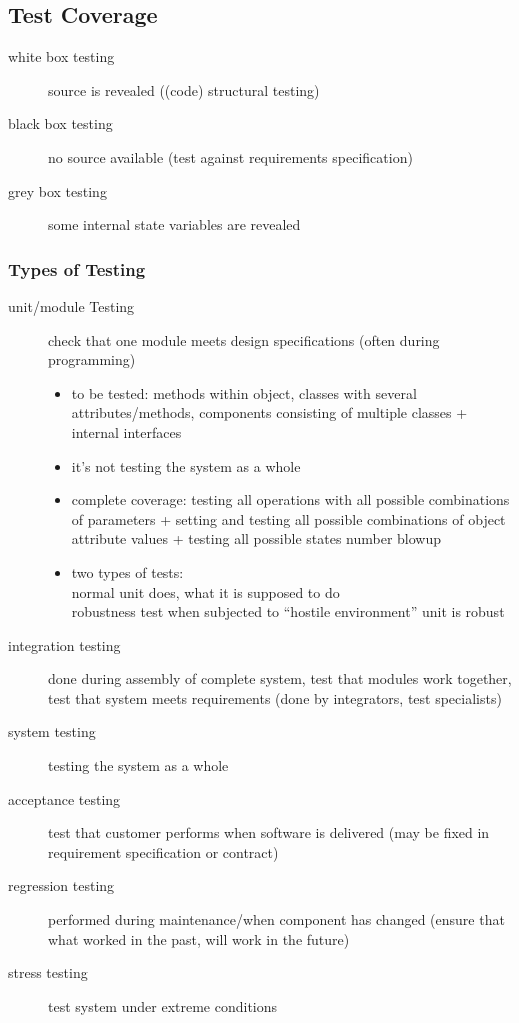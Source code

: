\documentclass[a4paper, 10pt]{article}
\begin{document}
\subsection{Test Coverage}
\begin{description}
	\item[white box testing] source is revealed ((code) structural testing)
	\item[black box testing] no source available (test against requirements specification)
	\item[grey box testing] some internal state variables are revealed
\end{description}
\subsubsection{Types of Testing}

\begin{description}
	\item[unit/module Testing] check that one module meets design specifications (often during programming)
	\begin{itemize}
		\item to be tested: methods within object, classes with several attributes/methods, components consisting of multiple classes + internal interfaces
		\item it's not testing the system as a whole
		\item complete coverage: testing all operations with all possible combinations of parameters + setting and testing all possible combinations of object attribute values + testing all possible states \follows number blowup
		\item two types of tests:\\
		normal \follows unit does, what it is supposed to do \\
		robustness test \follows when subjected to ``hostile environment'' unit is robust
	\end{itemize}
	\item[integration testing] done during assembly  of complete system, test that modules work together, test that system meets requirements (done by integrators, test specialists)
	\item[system testing] testing the system as a whole
	\item[acceptance testing] test that customer performs when software is delivered (may be fixed in requirement specification or contract)
	\item[regression testing] performed during maintenance/when component has changed (ensure that what worked in the past, will work in the future)
	\item[stress testing] test system under extreme conditions
\end{description}
\end{document}
